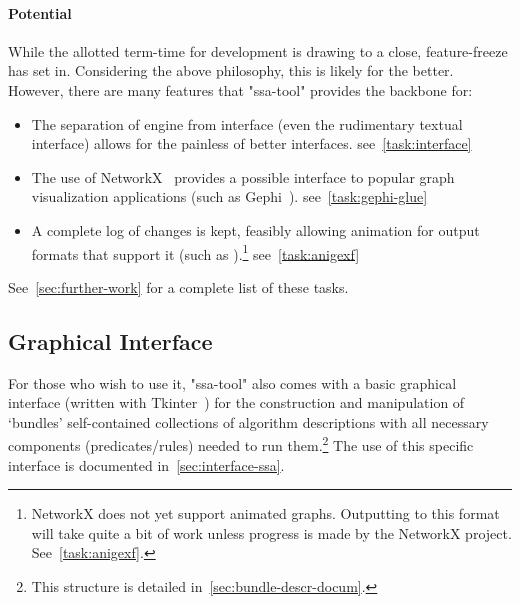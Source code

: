 \paragraph{Potential}
While the allotted term-time for development is drawing to a close,
  feature-freeze has set in.
Considering the above philosophy, this is likely for the better.
However, there are many features that "ssa-tool" provides the backbone for:
\begin{itemize}
\providecommand\TaskRef[1]{\hfill\mbox{see~\autoref{task:#1}}}
\item The separation of engine from interface (even the rudimentary textual interface)
  allows for the painless of better interfaces.
  \TaskRef{interface}
\item The use of NetworkX~\autocite{hagberg:networkx} provides a possible
  interface to popular graph visualization applications (such as Gephi~\autocite{gephi}).
  \TaskRef{gephi-glue}
\item A complete log of changes is kept, feasibly allowing animation for
  output formats that support it (such as ).\footnote{%
    NetworkX does not yet support animated graphs.
    Outputting to this format will take quite a bit of work
      unless progress is made by the NetworkX project.
    See~\autoref{task:anigexf}.}
  \TaskRef{anigexf}
\end{itemize}
See~\autoref{sec:further-work} for a complete list of these tasks.

\subsection{Graphical Interface}
For those who wish to use it,
  "ssa-tool" also comes with a basic graphical interface (written with Tkinter~\autocite{tkinter})
  for the construction and manipulation of \enquote*{bundles} \Dash
  self-contained collections of algorithm descriptions
  with all necessary components (predicates\slash rules)
  needed to run them.\footnote{This structure is detailed in~\autoref{sec:bundle-descr-docum}.}
The use of this specific interface is documented in~\autoref{sec:interface-ssa}.

